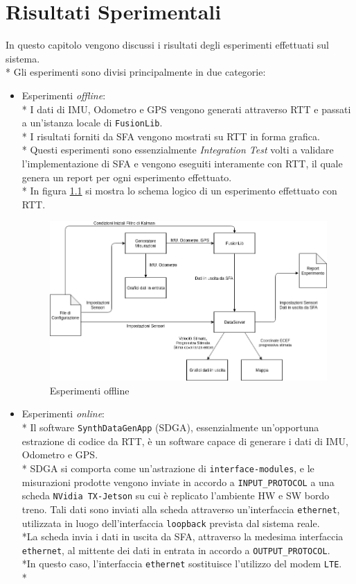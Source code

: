 \chapter{Risultati Sperimentali}
In questo capitolo vengono discussi i risultati degli esperimenti effettuati sul sistema.\\*
Gli esperimenti sono divisi principalmente in due categorie:
\begin{itemize}
	\item Esperimenti \emph{offline}:\\*
	I dati di IMU, Odometro e GPS vengono generati attraverso RTT e passati a un'istanza locale di \texttt{FusionLib}.\\*
	I risultati forniti da SFA vengono mostrati su RTT in forma grafica.\\* Questi esperimenti sono essenzialmente \emph{Integration Test} volti a validare l'implementazione di SFA e vengono eseguiti interamente con RTT, il quale genera un report per ogni esperimento effettuato.\\*
	In figura \ref{fig:rtt} si mostra lo schema logico di un esperimento effettuato con RTT.
	\begin{figure}[h]
		\centering
		\includegraphics[width=\linewidth]{img/rtt}
		\caption{Esperimenti offline}
		\label{fig:rtt}
	\end{figure}
	\item Esperimenti \emph{online}:\\*
	Il software \texttt{SynthDataGenApp} (SDGA), essenzialmente un'opportuna estrazione di codice da RTT, \`e un software capace di generare i dati di IMU, Odometro e GPS.\\*
	SDGA si comporta come un'astrazione di \texttt{interface-modules}, e le misurazioni prodotte vengono inviate in accordo a \texttt{INPUT\_PROTOCOL} a una scheda \texttt{NVidia TX-Jetson} su cui \`e replicato l'ambiente HW e SW bordo treno. Tali dati sono inviati alla scheda attraverso un'interfaccia \texttt{ethernet}, utilizzata in luogo dell'interfaccia \texttt{loopback} prevista dal sistema reale.\\*La scheda invia i dati in uscita da SFA, attraverso la medesima interfaccia \texttt{ethernet}, al mittente dei dati in entrata in accordo a \texttt{OUTPUT\_PROTOCOL}.\\*In questo caso, l'interfaccia \texttt{ethernet} sostituisce l'utilizzo del modem \texttt{LTE}.\\*

\end{itemize}
